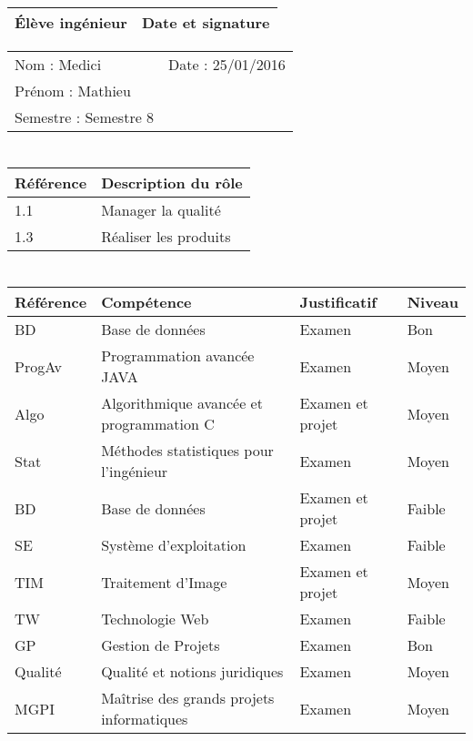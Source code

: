 \documentclass[11pt]{article}
\begin{document}

\begin{center}
\begin{table}[!hp]

	\begin{tabularx}{\linewidth}{|X|X|}
	\hline
	\rowcolor{gray!40} Élève ingénieur & Date et signature \\
	\hline
	\end{tabularx}
	\begin{tabularx}{\linewidth}{|X|X|}
	Nom : Medici & Date : 25/01/2016 \\ 
	Prénom : Mathieu & \\
	Semestre : Semestre 8 & \\
	\hline
	\end{tabularx}
\end{table}
\end{center}

\section*{\large\FR}

\centering
	\begin{longtable}{|p{4cm}|p{4cm}|}
	\hline
	\rowcolor{gray!40} Référence \WBSCourt & Description du rôle \\
	\hline
	 1.1 & Manager la qualité \\
	\hline
	 1.3 & Réaliser les produits \\
	 \hline
	\end{longtable}


\section*{\large\FC}

\centering
	\begin{longtable}{|p{3cm}|p{3cm}|p{3cm}|p{3cm}|}
	\hline
	\rowcolor{gray!40} Référence & Compétence & Justificatif & Niveau \\
	\hline
	 BD & Base de données & Examen & Bon \\
	 \hline
	 ProgAv & Programmation avancée JAVA & Examen & Moyen \\
	\hline
	Algo & Algorithmique avancée et programmation C & Examen et projet & Moyen \\
	\hline
	Stat & Méthodes statistiques pour l'ingénieur & Examen & Moyen \\
	\hline
	BD & Base de données & Examen et projet & Faible \\
	\hline
	SE & Système d'exploitation & Examen & Faible \\
	\hline
	TIM & Traitement d'Image & Examen et projet & Moyen \\
	\hline
	TW & Technologie Web & Examen & Faible \\
	\hline
	GP & Gestion de Projets & Examen & Bon \\
    \hline
	Qualité & Qualité et notions juridiques & Examen & Moyen \\
	\hline
	MGPI & Maîtrise des grands projets informatiques & Examen & Moyen \\
	\hline
	\end{longtable}
\end{document}
